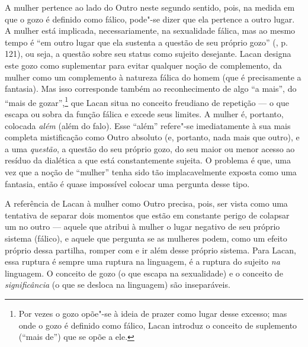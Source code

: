 A mulher pertence ao lado do Outro neste segundo sentido, pois, na
medida em que o gozo é definido como fálico, pode"-se dizer que ela
pertence a outro lugar. A mulher está implicada, necessariamente, na
sexualidade fálica, mas ao mesmo tempo é ``em outro lugar que ela
sustenta a questão de seu próprio gozo'' (, p. 121), ou seja, a
questão sobre seu status como sujeito desejante. Lacan designa este gozo
como suplementar para evitar qualquer noção de complemento, da mulher
como um complemento à natureza fálica do homem (que é precisamente a
fantasia). Mas isso corresponde também ao reconhecimento de algo ``a
mais'', do ``mais de gozar'',\footnote{Por vezes o gozo opõe"-se à ideia
  de prazer como lugar desse excesso; mas onde o gozo é definido como
  fálico, Lacan introduz o conceito de suplemento (``mais de'') que se
  opõe a ele.} que Lacan situa no conceito freudiano de repetição --- o
que escapa ou sobra da função fálica e excede seus limites. A mulher é,
portanto, colocada \emph{além} (além do falo). Esse ``além'' refere"-se
imediatamente à sua mais completa mistificação como Outro absoluto (e,
portanto, nada mais que outro), e a uma \emph{questão}, a questão do seu
próprio gozo, do seu maior ou menor acesso ao resíduo da dialética a que
está constantemente sujeita. O problema é que, uma vez que a noção de
``mulher'' tenha sido tão implacavelmente exposta como uma fantasia,
então é quase impossível colocar uma pergunta desse tipo.

A referência de Lacan à mulher como Outro precisa, pois, ser vista como
uma tentativa de separar dois momentos que estão em constante perigo de
colapsar um no outro --- aquele que atribui à mulher o lugar negativo de
seu próprio sistema (fálico), e aquele que pergunta se as mulheres
podem, como um efeito próprio dessa partilha, romper com e ir além desse
próprio sistema. Para Lacan, essa ruptura é sempre uma ruptura na
linguagem, é a ruptura do sujeito \emph{na} linguagem. O conceito de
gozo (o que escapa na sexualidade) e o conceito de \emph{significância}
(o que se desloca na linguagem) são inseparáveis.

